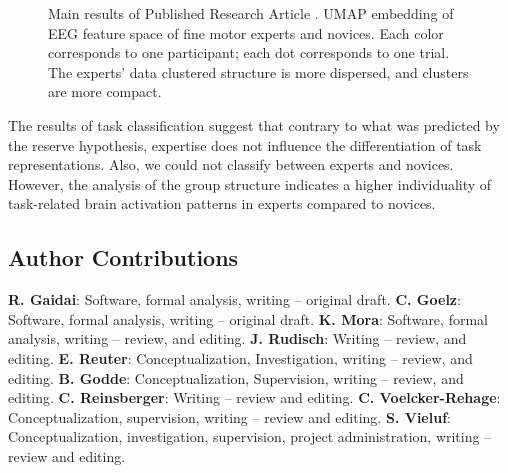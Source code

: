 \begin{figure}[ht]
\begin{center}

\caption[Main results of Published Research Article ]{Main results of Published Research Article . UMAP embedding of EEG feature space of fine motor experts and novices. Each color corresponds to one participant; each dot corresponds to one trial. The experts' data clustered structure is more dispersed, and clusters are more compact.}
\label{fig:results4}
\end{center}
\end{figure}

\newpage
\noindent The results of task classification suggest that contrary to what was predicted by the reserve hypothesis, expertise does not influence the differentiation of task representations. Also, we could not classify between experts and novices. However, the analysis of the group structure indicates a higher individuality of task-related brain activation patterns in experts compared to novices.

\subsection*{Author Contributions}
\textbf{R. Gaidai}: Software, formal analysis, writing – original draft.
\textbf{C. Goelz}: Software, formal analysis, writing – original draft.
\textbf{K. Mora}: Software, formal analysis, writing – review, and editing.  
\textbf{J. Rudisch}: Writing – review, and editing. 
\textbf{E. Reuter}: Conceptualization, Investigation, writing – review, and editing.  
\textbf{B. Godde}: Conceptualization, Supervision, writing – review, and editing. 
\textbf{C. Reinsberger}: Writing – review and editing. 
\textbf{C. Voelcker-Rehage}: Conceptualization, supervision, writing – review and editing.  
\textbf{S. Vieluf}: Conceptualization, investigation, supervision, project administration, writing – review and 
editing.